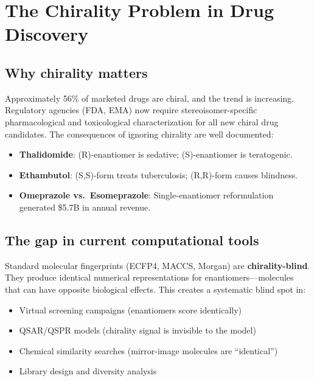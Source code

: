 \documentclass[11pt,a4paper]{article}
\begin{document}
\newpage

\section{The Chirality Problem in Drug Discovery}

\subsection{Why chirality matters}

Approximately 56\% of marketed drugs are chiral, and the trend is increasing.
Regulatory agencies (FDA, EMA) now require stereoisomer-specific pharmacological
and toxicological characterization for all new chiral drug candidates. The
consequences of ignoring chirality are well documented:

\begin{itemize}[leftmargin=1.5em]
  \item \textbf{Thalidomide}: (R)-enantiomer is sedative; (S)-enantiomer is teratogenic.
  \item \textbf{Ethambutol}: (S,S)-form treats tuberculosis; (R,R)-form causes blindness.
  \item \textbf{Omeprazole vs.\ Esomeprazole}: Single-enantiomer reformulation generated
    \$5.7B in annual revenue.
\end{itemize}

\subsection{The gap in current computational tools}

Standard molecular fingerprints (ECFP4, MACCS, Morgan) are
\textbf{chirality-blind}. They produce identical numerical representations for
enantiomers---molecules that can have opposite biological effects. This creates
a systematic blind spot in:

\begin{itemize}[leftmargin=1.5em]
  \item Virtual screening campaigns (enantiomers score identically)
  \item QSAR/QSPR models (chirality signal is invisible to the model)
  \item Chemical similarity searches (mirror-image molecules are ``identical'')
  \item Library design and diversity analysis
\end{itemize}
\end{document}
